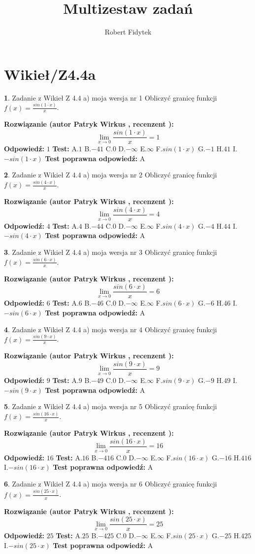 \documentclass[12pt, a4paper]{article}
\title{Multizestaw zadań}
\author{Robert Fidytek}
\date{}
\theoremstyle{definition} %
\newtheorem{zad}{}
\newcommand{\kategoria}[1]{\section{#1}}
\newcommand{\zadStart}[1]{\begin{zad}#1\newline}
\newcommand{\zadStop}{\end{zad}}
\newcommand{\rozwStart}[2]{\noindent \textbf{Rozwiązanie (autor #1 , recenzent #2): }\newline}
\newcommand{\rozwStop}{\newline}
\newcommand{\odpStart}{\noindent \textbf{Odpowiedź:}\newline}
\newcommand{\odpStop}{\newline}
\newcommand{\testStart}{\noindent \textbf{Test:}\newline}
\newcommand{\testStop}{\newline}
\newcommand{\kluczStart}{\noindent \textbf{Test poprawna odpowiedź:}\newline}
\newcommand{\kluczStop}{\newline}
\begin{document}
\maketitle

\kategoria{Wikieł/Z4.4a}


\zadStart{Zadanie z Wikieł Z 4.4 a) moja wersja nr 1}
Obliczyć granicę funkcji $f(x)=\frac{sin(1\cdot x)}{x}$.
\zadStop
\rozwStart{Patryk Wirkus}{}
$$\lim\limits_{x\to 0}\frac{sin(1\cdot x)}{x}=
1$$
\rozwStop
\odpStart
$1$
\odpStop
\testStart
A.$1$
B.$-41$
C.$0$
D.$-\infty$
E.$\infty$
F.$sin(1\cdot x)$
G.$-1$
H.$41$
I.$-sin(1\cdot x)$
\testStop
\kluczStart
A
\kluczStop



\zadStart{Zadanie z Wikieł Z 4.4 a) moja wersja nr 2}
Obliczyć granicę funkcji $f(x)=\frac{sin(4\cdot x)}{x}$.
\zadStop
\rozwStart{Patryk Wirkus}{}
$$\lim\limits_{x\to 0}\frac{sin(4\cdot x)}{x}=
4$$
\rozwStop
\odpStart
$4$
\odpStop
\testStart
A.$4$
B.$-44$
C.$0$
D.$-\infty$
E.$\infty$
F.$sin(4\cdot x)$
G.$-4$
H.$44$
I.$-sin(4\cdot x)$
\testStop
\kluczStart
A
\kluczStop



\zadStart{Zadanie z Wikieł Z 4.4 a) moja wersja nr 3}
Obliczyć granicę funkcji $f(x)=\frac{sin(6\cdot x)}{x}$.
\zadStop
\rozwStart{Patryk Wirkus}{}
$$\lim\limits_{x\to 0}\frac{sin(6\cdot x)}{x}=
6$$
\rozwStop
\odpStart
$6$
\odpStop
\testStart
A.$6$
B.$-46$
C.$0$
D.$-\infty$
E.$\infty$
F.$sin(6\cdot x)$
G.$-6$
H.$46$
I.$-sin(6\cdot x)$
\testStop
\kluczStart
A
\kluczStop



\zadStart{Zadanie z Wikieł Z 4.4 a) moja wersja nr 4}
Obliczyć granicę funkcji $f(x)=\frac{sin(9\cdot x)}{x}$.
\zadStop
\rozwStart{Patryk Wirkus}{}
$$\lim\limits_{x\to 0}\frac{sin(9\cdot x)}{x}=
9$$
\rozwStop
\odpStart
$9$
\odpStop
\testStart
A.$9$
B.$-49$
C.$0$
D.$-\infty$
E.$\infty$
F.$sin(9\cdot x)$
G.$-9$
H.$49$
I.$-sin(9\cdot x)$
\testStop
\kluczStart
A
\kluczStop



\zadStart{Zadanie z Wikieł Z 4.4 a) moja wersja nr 5}
Obliczyć granicę funkcji $f(x)=\frac{sin(16\cdot x)}{x}$.
\zadStop
\rozwStart{Patryk Wirkus}{}
$$\lim\limits_{x\to 0}\frac{sin(16\cdot x)}{x}=
16$$
\rozwStop
\odpStart
$16$
\odpStop
\testStart
A.$16$
B.$-416$
C.$0$
D.$-\infty$
E.$\infty$
F.$sin(16\cdot x)$
G.$-16$
H.$416$
I.$-sin(16\cdot x)$
\testStop
\kluczStart
A
\kluczStop



\zadStart{Zadanie z Wikieł Z 4.4 a) moja wersja nr 6}
Obliczyć granicę funkcji $f(x)=\frac{sin(25\cdot x)}{x}$.
\zadStop
\rozwStart{Patryk Wirkus}{}
$$\lim\limits_{x\to 0}\frac{sin(25\cdot x)}{x}=
25$$
\rozwStop
\odpStart
$25$
\odpStop
\testStart
A.$25$
B.$-425$
C.$0$
D.$-\infty$
E.$\infty$
F.$sin(25\cdot x)$
G.$-25$
H.$425$
I.$-sin(25\cdot x)$
\testStop
\kluczStart
A
\kluczStop
\end{document}
